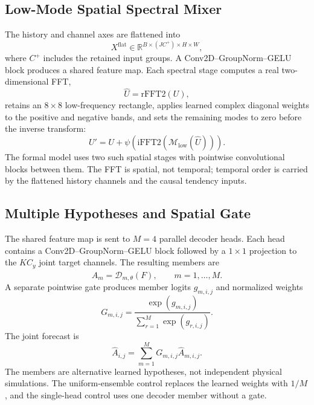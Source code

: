 \documentclass[conference]{IEEEtran}
\begin{document}
\subsection{Low-Mode Spatial Spectral Mixer}
The history and channel axes are flattened into
\begin{equation}
X^{\mathrm{flat}}\in\mathbb{R}^{B\times(JC^+)\times H\times W},
\end{equation}
where $C^+$ includes the retained input groups. A Conv2D--GroupNorm--GELU block produces a shared feature map. Each spectral stage computes a real two-dimensional FFT,
\begin{equation}
\widehat{U}=\mathrm{rFFT2}(U),
\end{equation}
retains an $8\times8$ low-frequency rectangle, applies learned complex diagonal weights to the positive and negative bands, and sets the remaining modes to zero before the inverse transform:
\begin{equation}
U'=U+\psi\left(\mathrm{iFFT2}\left(\mathcal{M}_{\mathrm{low}}(\widehat{U})\right)\right).
\label{eq:spectral}
\end{equation}
The formal model uses two such spatial stages with pointwise convolutional blocks between them. The FFT is spatial, not temporal; temporal order is carried by the flattened history channels and the causal tendency inputs.

\subsection{Multiple Hypotheses and Spatial Gate}
The shared feature map is sent to $M=4$ parallel decoder heads. Each head contains a Conv2D--GroupNorm--GELU block followed by a $1\times1$ projection to the $K C_y$ joint target channels. The resulting members are
\begin{equation}
\widehat{A}_m=\mathcal{D}_{m,\theta}(F),\qquad m=1,\ldots,M.
\end{equation}
A separate pointwise gate produces member logits $g_{m,i,j}$ and normalized weights
\begin{equation}
G_{m,i,j}=\frac{\exp(g_{m,i,j})}{\sum_{r=1}^{M}\exp(g_{r,i,j})}.
\end{equation}
The joint forecast is
\begin{equation}
\widehat{A}_{i,j}=\sum_{m=1}^{M}G_{m,i,j}\widehat{A}_{m,i,j}.
\label{eq:ensemble}
\end{equation}
The members are alternative learned hypotheses, not independent physical simulations. The uniform-ensemble control replaces the learned weights with $1/M$, and the single-head control uses one decoder member without a gate.
\end{document}

